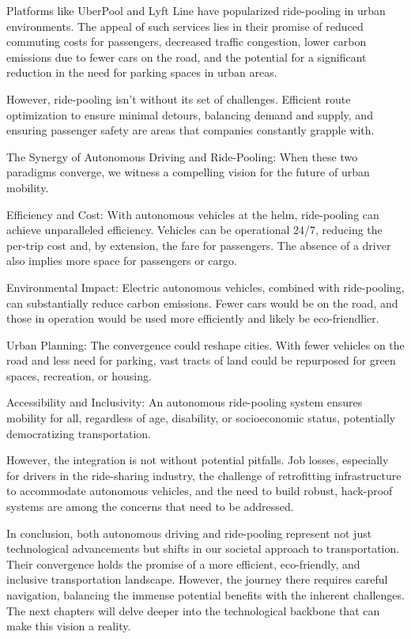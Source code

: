 Platforms like UberPool and Lyft Line have popularized ride-pooling in urban environments. The appeal of such services lies in their promise of reduced commuting costs for passengers, decreased traffic congestion, lower carbon emissions due to fewer cars on the road, and the potential for a significant reduction in the need for parking spaces in urban areas.

However, ride-pooling isn't without its set of challenges. Efficient route optimization to ensure minimal detours, balancing demand and supply, and ensuring passenger safety are areas that companies constantly grapple with.

The Synergy of Autonomous Driving and Ride-Pooling:
When these two paradigms converge, we witness a compelling vision for the future of urban mobility.

Efficiency and Cost: With autonomous vehicles at the helm, ride-pooling can achieve unparalleled efficiency. Vehicles can be operational 24/7, reducing the per-trip cost and, by extension, the fare for passengers. The absence of a driver also implies more space for passengers or cargo.

Environmental Impact: Electric autonomous vehicles, combined with ride-pooling, can substantially reduce carbon emissions. Fewer cars would be on the road, and those in operation would be used more efficiently and likely be eco-friendlier.

Urban Planning: The convergence could reshape cities. With fewer vehicles on the road and less need for parking, vast tracts of land could be repurposed for green spaces, recreation, or housing.

Accessibility and Inclusivity: An autonomous ride-pooling system ensures mobility for all, regardless of age, disability, or socioeconomic status, potentially democratizing transportation.

However, the integration is not without potential pitfalls. Job losses, especially for drivers in the ride-sharing industry, the challenge of retrofitting infrastructure to accommodate autonomous vehicles, and the need to build robust, hack-proof systems are among the concerns that need to be addressed.

In conclusion, both autonomous driving and ride-pooling represent not just technological advancements but shifts in our societal approach to transportation. Their convergence holds the promise of a more efficient, eco-friendly, and inclusive transportation landscape. However, the journey there requires careful navigation, balancing the immense potential benefits with the inherent challenges. The next chapters will delve deeper into the technological backbone that can make this vision a reality.